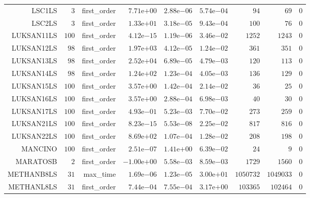 \begin{longtable}{rrrrrrrrr}
LSC1LS & \(     3\) & first\_order & \( 7.71\)e\(+00\) & \( 2.88\)e\(-06\) & \( 5.74\)e\(-04\) & \(    94\) & \(    69\) & \(     0\) \\
LSC2LS & \(     3\) & first\_order & \( 1.33\)e\(+01\) & \( 3.18\)e\(-05\) & \( 9.43\)e\(-04\) & \(   100\) & \(    76\) & \(     0\) \\
LUKSAN11LS & \(   100\) & first\_order & \( 4.12\)e\(-15\) & \( 1.19\)e\(-06\) & \( 3.46\)e\(-02\) & \(  1252\) & \(  1243\) & \(     0\) \\
LUKSAN12LS & \(    98\) & first\_order & \( 1.97\)e\(+03\) & \( 4.12\)e\(-05\) & \( 1.24\)e\(-02\) & \(   361\) & \(   351\) & \(     0\) \\
LUKSAN13LS & \(    98\) & first\_order & \( 2.52\)e\(+04\) & \( 6.89\)e\(-05\) & \( 4.79\)e\(-03\) & \(   120\) & \(   113\) & \(     0\) \\
LUKSAN14LS & \(    98\) & first\_order & \( 1.24\)e\(+02\) & \( 1.23\)e\(-04\) & \( 4.05\)e\(-03\) & \(   136\) & \(   129\) & \(     0\) \\
LUKSAN15LS & \(   100\) & first\_order & \( 3.57\)e\(+00\) & \( 1.42\)e\(-04\) & \( 2.14\)e\(-02\) & \(    36\) & \(    25\) & \(     0\) \\
LUKSAN16LS & \(   100\) & first\_order & \( 3.57\)e\(+00\) & \( 2.88\)e\(-04\) & \( 6.98\)e\(-03\) & \(    40\) & \(    30\) & \(     0\) \\
LUKSAN17LS & \(   100\) & first\_order & \( 4.93\)e\(-01\) & \( 5.23\)e\(-03\) & \( 7.70\)e\(-02\) & \(   273\) & \(   259\) & \(     0\) \\
LUKSAN21LS & \(   100\) & first\_order & \( 8.23\)e\(-15\) & \( 5.53\)e\(-08\) & \( 2.25\)e\(-02\) & \(   817\) & \(   816\) & \(     0\) \\
LUKSAN22LS & \(   100\) & first\_order & \( 8.69\)e\(+02\) & \( 1.07\)e\(-04\) & \( 1.28\)e\(-02\) & \(   208\) & \(   198\) & \(     0\) \\
MANCINO & \(   100\) & first\_order & \( 2.51\)e\(-07\) & \( 1.41\)e\(+00\) & \( 6.39\)e\(-02\) & \(    24\) & \(     9\) & \(     0\) \\
MARATOSB & \(     2\) & first\_order & \(-1.00\)e\(+00\) & \( 5.58\)e\(-03\) & \( 8.59\)e\(-03\) & \(  1729\) & \(  1560\) & \(     0\) \\
METHANB8LS & \(    31\) & max\_time & \( 1.69\)e\(-06\) & \( 1.23\)e\(-05\) & \( 3.00\)e\(+01\) & \(1050732\) & \(1049033\) & \(     0\) \\
METHANL8LS & \(    31\) & first\_order & \( 7.44\)e\(-04\) & \( 7.55\)e\(-04\) & \( 3.17\)e\(+00\) & \(103365\) & \(102464\) & \(     0\) \\

\end{longtable}
